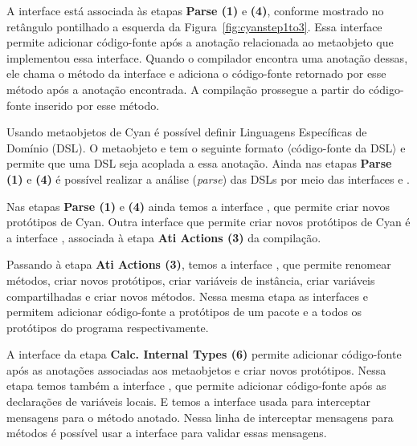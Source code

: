 A interface  está associada às etapas \textbf{Parse (1)} e \textbf{(4)}, conforme mostrado no retângulo pontilhado a esquerda da Figura~\ref{fig:cyanstep1to3}. Essa interface permite adicionar código-fonte após a anotação relacionada ao metaobjeto que implementou essa interface. Quando o compilador encontra uma anotação dessas, ele chama o método  da interface  e adiciona o código-fonte retornado por esse método após a anotação encontrada. A compilação prossegue a partir do código-fonte inserido por esse método.

Usando metaobjetos de Cyan é possível definir Linguagens Específicas de Domínio (DSL). O metaobjeto  e tem o seguinte formato  $\langle$código-fonte da DSL$\rangle$ \srcstyle{*\}} e permite que uma DSL seja acoplada a essa anotação. Ainda nas etapas \textbf{Parse (1)} e \textbf{(4)} é possível realizar a análise (\emph{parse}) das DSLs por meio das interfaces  e . 

Nas etapas \textbf{Parse (1)} e \textbf{(4)} ainda temos a interface , que permite criar novos protótipos de Cyan. Outra interface que permite criar novos protótipos de Cyan é a interface , associada à etapa \textbf{Ati Actions (3)} da compilação.

Passando à etapa \textbf{Ati Actions (3)}, temos a interface , que permite renomear métodos, criar novos protótipos, criar variáveis de instância, criar variáveis compartilhadas e criar novos métodos. Nessa mesma etapa as interfaces  e  permitem adicionar código-fonte a protótipos de um pacote e a todos os protótipos do programa respectivamente.

A interface  da etapa \textbf{Calc. Internal Types (6)} permite adicionar código-fonte após as anotações associadas aos metaobjetos e criar novos protótipos. Nessa etapa temos também a interface , que permite adicionar  código-fonte após as declarações de variáveis locais. E temos a interface  usada para interceptar mensagens para o método anotado. Nessa linha de interceptar mensagens para métodos é possível usar a interface  para validar essas mensagens.

